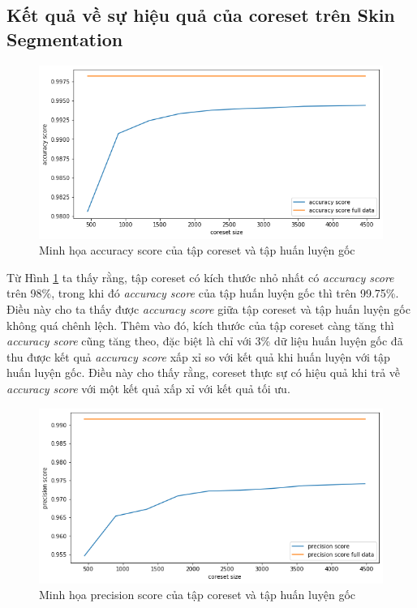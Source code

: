 \documentclass[a4paper, 12pt, oneside]{report}
\begin{document}
\subsection{Kết quả về sự hiệu quả của coreset trên Skin Segmentation }
\begin{center}
    \begin{figure}[H]
    \begin{center}
     \includegraphics[scale=0.5]{accuracy_skin.png}
    \end{center}
    \caption{Minh họa accuracy score của tập coreset và tập huấn luyện gốc}
    \label{Hình 4.7}
    \end{figure}
\end{center}
Từ Hình \ref{Hình 4.7} ta thấy rằng, tập coreset có kích thước nhỏ nhất có \textit{accuracy score} trên 98\%, trong khi đó \textit{accuracy score} của tập huấn luyện gốc thì trên 99.75\%. Điều này cho ta thấy được \textit{accuracy score} giữa tập coreset và tập huấn luyện gốc không quá chênh lệch. Thêm vào đó, kích thước của tập coreset càng tăng thì \textit{accuracy score} cũng tăng theo, đặc biệt là chỉ với 3\% 
dữ liệu huấn luyện gốc đã thu được kết quả \textit{accuracy score} xấp xỉ so với kết quả khi huấn luyện với tập huấn luyện gốc. Điều này cho thấy rằng, coreset thực sự có hiệu quả khi trả về \textit{accuracy score} với một kết quả xấp xỉ với kết quả tối ưu. 
\begin{center}
    \begin{figure}[H]
    \begin{center}
     \includegraphics[scale=0.5]{precision_skin.png}
    \end{center}
    \caption{Minh họa precision score của tập coreset và tập huấn luyện gốc}
    \label{Hình 4.8}
    \end{figure}
\end{center}
\end{document}
